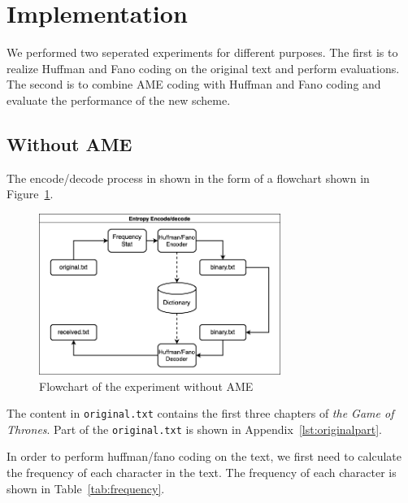 \documentclass[12pt,twoside]{article}
\begin{document}
\section{Implementation}

We performed two seperated experiments for different purposes. The first is to realize Huffman and Fano coding on the original text and perform evaluations. The second is to combine AME coding with Huffman and Fano coding and evaluate the performance of the new scheme.

\subsection{Without AME}

The encode/decode process in shown in the form of a flowchart shown in Figure~\ref{fig:without-ame}.

\begin{figure}[h!]
    \centering
    \includegraphics[width=0.7\textwidth]{without-ame.png}
    \caption{Flowchart of the experiment without AME}
    \label{fig:without-ame}
\end{figure}

The content in \texttt{original.txt} contains the first three chapters of \textit{the Game of Thrones}. Part of the \texttt{original.txt} is shown in Appendix~\ref{lst:originalpart}.

In order to perform huffman/fano coding on the text, we first need to calculate the frequency of each character in the text. The frequency of each character is shown in Table~\ref{tab:frequency}.
\end{document}
